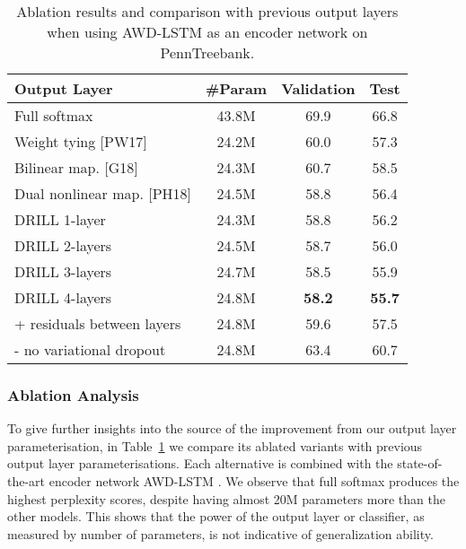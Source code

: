 \documentclass{article}
\begin{document}
\begin{table}[t]\small
	\centering
	{\def\arraystretch{1.1}\tabcolsep=3.5pt\begin{tabular}{l|ccc}
		\toprule
		\bf Output Layer & \bf \#Param & \bf Validation &  \bf Test \\
		\midrule
        Full softmax                    & 43.8M & 69.9 & 66.8 \\
        Weight tying [PW17]             & 24.2M & 60.0 & 57.3 \\
        Bilinear map. [G18]             & 24.3M & 60.7 & 58.5  \\  
        Dual nonlinear map. [PH18]      & 24.5M & 58.8 & 56.4  \\ \hline
        DRILL 1-layer                    & 24.3M & 58.8 & 56.2 \\ 
        DRILL 2-layers                   & 24.5M & 58.7 & 56.0\\ 
        DRILL 3-layers                   & 24.7M & 58.5 & 55.9\\ 
        DRILL 4-layers                   & 24.8M & \textbf{58.2} & \textbf{55.7} \\ 
        \hspace{2mm}  + residuals between layers   & 24.8M & 59.6 & 57.5 \\ 
        \hspace{2mm}  - no variational dropout        & 24.8M & 63.4 & 60.7\\ 
		\bottomrule
	\end{tabular}}
	\vspace{-2mm}
	\caption{\small 
	Ablation results and comparison with previous output layers when using AWD-LSTM \cite{merity2017regularizing} as an encoder network on PennTreebank.
	}
	\label{table:ablation}
	\vspace{-4mm}
\end{table}


\subsubsection{Ablation Analysis}

To give further insights into the source of the improvement from our output layer parameterisation, in Table~\ref{table:ablation} we compare its ablated variants with previous output layer parameterisations.  Each alternative is combined with the state-of-the-art encoder network AWD-LSTM \citep{merity2017regularizing}. We observe that full softmax produces the highest perplexity scores, despite having almost 20M parameters more than the other models. This shows that the power of the output layer or classifier, as measured by number of parameters, is not indicative of generalization ability. 
\end{document}
